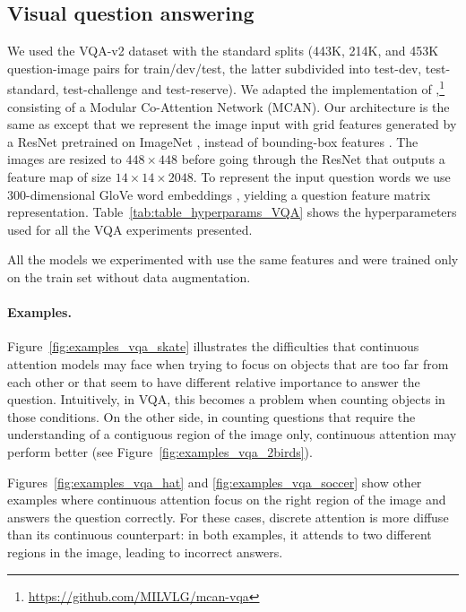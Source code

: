 \documentclass{article}
\begin{document}
\subsection{Visual question answering}

We used the VQA-v2 dataset \cite{Goyal2019} with the standard splits (443K, 214K, and 453K question-image pairs for train/dev/test, the latter subdivided into  test-dev, test-standard, test-challenge and test-reserve). We adapted the implementation of \cite{Yu2019},\footnote{\url{https://github.com/MILVLG/mcan-vqa}} consisting of a Modular Co-Attention Network (MCAN). Our architecture is the same as \cite{Yu2019} except that we represent the image input with grid features generated by a ResNet \cite{He2016} pretrained on ImageNet \cite{Russakovsky2015}, instead of bounding-box features \cite{Anderson2018}. 
The images are resized to $448 \times 448$ before going through the ResNet that outputs a feature map of size $14 \times 14 \times 2048$. To represent the input question words we use 300-dimensional GloVe word embeddings \cite{pennington2014glove}, yielding a question feature matrix representation. Table~\ref{tab:table_hyperparams_VQA} shows the hyperparameters used for all the VQA experiments presented.

All the models we experimented with use the same features and were trained only on the train set without data augmentation.

\paragraph{Examples.} 
Figure~\ref{fig:examples_vqa_skate} illustrates the difficulties that continuous attention models may face when trying to focus on objects that are too far from each other or that seem to have different relative importance to answer the question. Intuitively, in VQA, this becomes a problem when counting objects in those conditions. On the other side, in counting questions that require the understanding of a contiguous region of the image only, continuous attention may perform better (see Figure~\ref{fig:examples_vqa_2birds}).

Figures~\ref{fig:examples_vqa_hat} and \ref{fig:examples_vqa_soccer} show other examples where continuous attention focus on the right region of the image and answers the question correctly. For these cases, discrete attention is more diffuse than its continuous counterpart: in both examples, it attends to two different regions in the image, leading to incorrect answers.
\end{document}
